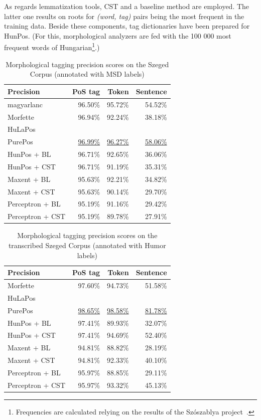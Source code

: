 As regards lemmatization tools, CST and a baseline method are employed. 
The latter one results on roots for \emph{(word, tag)} pairs being the most frequent in the training data. 
Beside these components, tag dictionaries have been prepared for HunPos. 
(For this, morphological analyzers are fed with the 100 000 most frequent words of Hungarian\footnote{Frequencies are calculated relying on the results of the Szószablya project~\cite{Halacsy2004}.}.) %

\begin{table}[ht]
 \centering
 \caption{Morphological tagging precision scores on the Szeged Corpus (annotated with MSD labels)}
\begin{tabular}{l r r r}
  \hline
  Precision &  PoS tag &  Token &  Sentence \\
  \hline
  magyarlanc &  96.50\% &  95.72\% &  54.52\% \\
  Morfette &  96.94\% &  92.24\% &  38.18\% \\
  HuLaPos &   &   &   \\
  PurePos &  \underline{96.99\%} &  \underline{96.27\%} &  \underline{58.06\%} \\
  HunPos + BL &  96.71\% &  92.65\% &  36.06\% \\
  HunPos + CST &  96.71\% &  91.19\% &  35.31\% \\
  Maxent + BL &  95.63\% &  92.21\% &  34.82\% \\
  Maxent + CST &  95.63\% &  90.14\% &  29.70\% \\
  Perceptron + BL &  95.19\% &  91.16\% &  29.42\% \\
  Perceptron + CST &  95.19\% &  89.78\% &  27.91\% \\
  \hline
\end{tabular}
\label{tab:morphtag-orig}
\end{table}


\begin{table}[ht]
 \centering
 \caption{Morphological tagging precision scores on the transcribed Szeged Corpus (annotated with Humor labels)}
\begin{tabular}{l r r r}
  \hline
  Precision &  PoS tag &  Token &  Sentence \\
  \hline
  Morfette &  97.60\% &  94.73\% &  51.58\% \\
  HuLaPos &   &   &   \\
  PurePos &  \underline{98.65\%} &  \underline{98.58\%} &  \underline{81.78\%} \\
  HunPos + BL &  97.41\% &  89.93\% &  32.07\% \\
  HunPos + CST &  97.41\% &  94.69\% &  52.40\% \\
  Maxent + BL &  94.81\% &  88.82\% &  28.19\% \\
  Maxent + CST &  94.81\% &  92.33\% &  40.10\% \\
  Perceptron + BL &  95.97\% &  88.85\% &  29.11\% \\
  Perceptron + CST &  95.97\% &  93.32\% &  45.13\% \\
  \hline
\end{tabular}
\label{tab:morphtag-humor}
\end{table}


